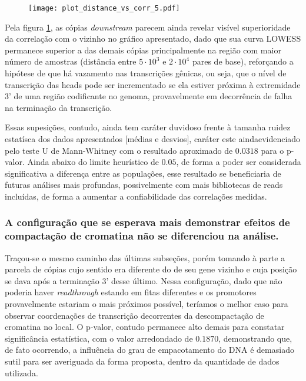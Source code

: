 \documentclass[12pt]{article}
\begin{document}
\begin{multicols}{2}
\begin{figure}[H]
	\centering
	\label{updownstream}
	\texttt{[image: plot\_distance\_vs\_corr\_5.pdf]}
\end{figure}

Pela figura \ref{updownstream}, as cópias \textit{downstream} parecem ainda revelar visível superioridade da correlação com o vizinho no gráfico apresentado, dado que sua curva LOWESS permanece superior a das demais cópias principalmente na região com maior número de amostras (distância entre \(5\cdot 10^3\) e \(2 \cdot 10^4\) pares de base), reforçando a hipótese de que há vazamento nas transcrições gênicas, ou seja, que o nível de transcrição das heads pode ser incrementado se ela estiver próxima à extremidade 3' de uma região codificante no genoma, provavelmente em decorrência de falha na terminação da transcrição.

Essas supesições, contudo, ainda tem caráter duvidoso frente à tamanha ruidez estatísca dos dados apresentados [médias e desvios], caráter este aindaevidenciado pelo teste U de Mann-Whitney com o resultado aproximado de \(0.0318\) para o p-valor. Ainda abaixo do limite heurístico de \(0.05\), de forma a poder ser considerada significativa a diferença entre as populações, esse resultado se beneficiaria de futuras análises mais profundas, possivelmente com mais bibliotecas de reads incluídas, de forma a aumentar a confiabilidade das correlações medidas.

\subsubsection{A configuração que se esperava mais demonstrar efeitos de compactação de cromatina não se diferenciou na análise.}
Traçou-se o mesmo caminho das últimas subseções, porém tomando à parte a parcela de cópias cujo sentido era diferente do de seu gene vizinho e cuja posição se dava após a terminação 3' desse último. Nessa configuração, dado que não poderia haver \textit{readthrough} estando em fitas diferentes e os promotores provavelmente estariam o mais próximos possível, teríamos o melhor caso para observar coordenações de transcrição decorrentes da descompactação de cromatina no local. O p-valor, contudo permanece alto demais para constatar significância estatística, com o valor arredondado de \(0.1870\), demonstrando que, de fato ocorrendo, a influência do grau de empacotamento do DNA é demasiado sutil para ser averiguada da forma proposta, dentro da quantidade de dados utilizada.


\end{multicols}
\end{document}
